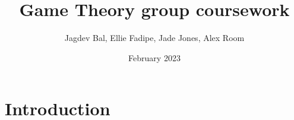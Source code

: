 \documentclass{article}
\title{Game Theory group coursework}
\author{Jagdev Bal, Ellie Fadipe, Jade Jones, Alex Room}
\date{February 2023}
\begin{document}
\maketitle

\section{Introduction}
\end{document}

